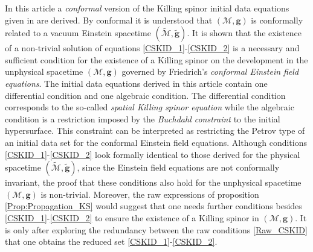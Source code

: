 \documentclass[10pt,a4paper]{article}
\theoremstyle{plain}
\def\bmg{{\bm g}}
\begin{document}
In this article a \emph{conformal} version of the Killing spinor
initial data equations given in \cite{GarVal08c} are derived. By
conformal it is understood that $(\mathcal{M},\bmg)$ is conformally
related to a vacuum Einstein spacetime $(\tilde{\mathcal{M}},\tilde{\bmg})$.
It is shown that the existence of a non-trivial solution of equations
\eqref{CSKID_1}-\eqref{CSKID_2} is a necessary and sufficient
condition for the existence of a Killing spinor on the development in
the unphysical spacetime $(\mathcal{M},\bmg)$ governed by Friedrich's
\emph{conformal Einstein field equations}.
  The initial data equations derived in this article contain one differential condition and one
  algebraic condition.  The differential condition corresponds to the
  so-called \emph{spatial Killing spinor equation} while the algebraic
  condition is a restriction imposed by the \emph{Buchdahl constraint} to the initial
  hypersurface. This constraint can be interpreted as restricting the Petrov type
  of an initial data set for the conformal Einstein field equations.
  Although conditions \eqref{CSKID_1}-\eqref{CSKID_2} look formally
  identical to those derived for the physical spacetime
  $(\tilde{\mathcal{M}},\tilde{\bmg})$, since the Einstein field
  equations are not conformally invariant, the proof that these
  conditions also hold for the unphysical spacetime
  $(\mathcal{M},\bmg)$ is non-trivial.  Moreover, the raw expressions
  of proposition \ref{Prop:Propagation_KS} would suggest that one
  needs further conditions besides \eqref{CSKID_1}-\eqref{CSKID_2} to
  ensure the existence of a Killing spinor in $(\mathcal{M},\bmg)$. It
  is only after exploring the redundancy between the raw conditions
  \eqref{Raw_CSKID} that one obtains the reduced set
  \eqref{CSKID_1}-\eqref{CSKID_2}.

  \medskip
\end{document}
